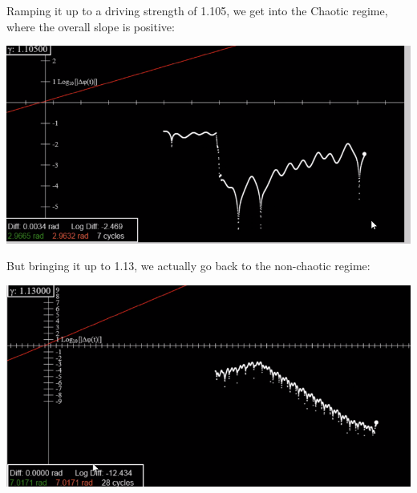 \documentclass[../PHYS306Notes.tex]{subfiles}
\begin{document}
Ramping it up to a driving strength of 1.105, we get into the Chaotic regime, where the overall slope is positive:
\begin{center}
    \includegraphics[scale=0.7]{Lecture-33/l33-img7.png}    
\end{center}
But bringing it up to 1.13, we actually go back to the non-chaotic regime:
\begin{center}
    \includegraphics[scale=0.7]{Lecture-33/l33-img8.png}    
\end{center}
\end{document}
